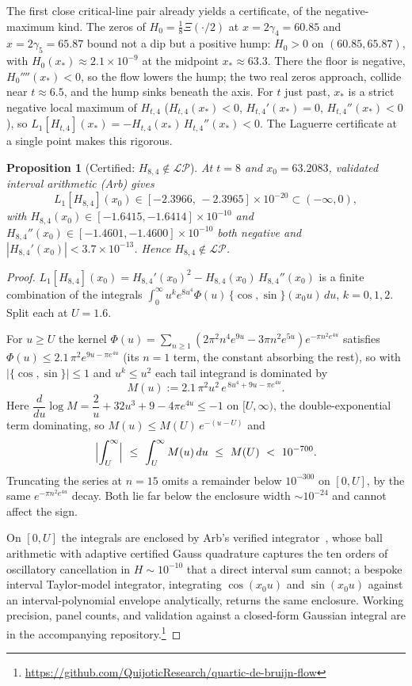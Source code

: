 \documentclass[11pt,reqno]{amsart}
\theoremstyle{plain}
\newtheorem{proposition}[theorem]{Proposition}
\theoremstyle{definition}
\theoremstyle{remark}
\newcommand{\LP}{\mathcal{LP}}
\begin{document}
The first close critical-line pair already yields a certificate, of the
negative-maximum kind. The zeros of $H_0=\tfrac18\Xi(\cdot/2)$ at
$x=2\gamma_4=60.85$ and $x=2\gamma_5=65.87$ bound not a dip but a positive
hump: $H_0>0$ on $(60.85,65.87)$, with $H_0(x_*)\approx2.1\times10^{-9}$ at the
midpoint $x_*\approx63.3$. There the floor is negative, $H_0''''(x_*)<0$, so the
flow lowers the hump; the two real zeros approach, collide near $t\approx6.5$,
and the hump sinks beneath the axis. For $t$ just past, $x_*$ is a strict
negative local maximum of $H_{t,4}$ ($H_{t,4}(x_*)<0$, $H_{t,4}'(x_*)=0$,
$H_{t,4}''(x_*)<0$), so $L_1[H_{t,4}](x_*)=-H_{t,4}(x_*)\,H_{t,4}''(x_*)<0$. The Laguerre certificate at a single point makes this rigorous.

\begin{proposition}[Certified: $H_{8,4}\notin\LP$]\label{prop:leave}
At $t=8$ and $x_0=63.2083$, validated interval arithmetic (Arb) gives
\[
   L_1[H_{8,4}](x_0)\in[-2.3966,\,-2.3965]\times10^{-20}\subset(-\infty,0),
\]
with $H_{8,4}(x_0)\in[-1.6415,-1.6414]\times10^{-10}$ and
$H_{8,4}''(x_0)\in[-1.4601,-1.4600]\times10^{-10}$ both negative and
$|H_{8,4}'(x_0)|<3.7\times10^{-13}$. Hence $H_{8,4}\notin\LP$.
\end{proposition}

\begin{proof}
$L_1[H_{8,4}](x_0)=H_{8,4}'(x_0)^2-H_{8,4}(x_0)\,H_{8,4}''(x_0)$ is a finite
combination of the integrals $\int_0^\infty u^k e^{8u^4}\Phi(u)\,\{\cos,\sin\}(x_0u)\,du$,
$k=0,1,2$. Split each at $U=1.6$.

For $u\ge U$ the kernel $\Phi(u)=\sum_{n\ge1}(2\pi^2n^4e^{9u}-3\pi n^2e^{5u})
e^{-\pi n^2e^{4u}}$ satisfies $\Phi(u)\le2.1\,\pi^2e^{9u-\pi e^{4u}}$ (its $n=1$
term, the constant absorbing the rest), so with $|\{\cos,\sin\}|\le1$ and
$u^k\le u^2$ each tail integrand is dominated by
\[
   M(u):=2.1\,\pi^2u^2\,e^{\,8u^4+9u-\pi e^{4u}}.
\]
Here $\dfrac{d}{du}\log M=\dfrac2u+32u^3+9-4\pi e^{4u}\le-1$ on $[U,\infty)$, the
double-exponential term dominating, so $M(u)\le M(U)\,e^{-(u-U)}$ and
\[
   \Bigl|\int_U^\infty\Bigr|\ \le\ \int_U^\infty M(u)\,du\ \le\ M(U)\ <\ 10^{-700}.
\]
Truncating the series at $n=15$ omits a remainder below $10^{-300}$ on $[0,U]$, by
the same $e^{-\pi n^2e^{4u}}$ decay. Both lie far below the enclosure width
$\sim10^{-24}$ and cannot affect the sign.

On $[0,U]$ the integrals are enclosed by Arb's verified
integrator~\cite{Johansson}, whose ball arithmetic with adaptive certified Gauss
quadrature captures the ten orders of oscillatory cancellation in $H\sim10^{-10}$
that a direct interval sum cannot; a bespoke interval Taylor-model integrator,
integrating $\cos(x_0u)$ and $\sin(x_0u)$ against an interval-polynomial envelope
analytically, returns the same enclosure. Working precision, panel counts, and
validation against a closed-form Gaussian integral are in the accompanying
repository.\footnote{\url{https://github.com/QuijoticResearch/quartic-de-bruijn-flow}}
\end{proof}
\end{document}
